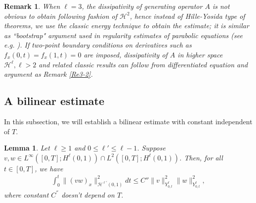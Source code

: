 \documentclass[10pt,a4paper,final]{article}
\numberwithin{equation}{section}
\newtheorem{lemma}[theorem]{Lemma}
\newtheorem{remark}[theorem]{Remark}
\newcommand{\cH}{\mathcal{H}}
\begin{document}
\begin{remark}
When $\ell=3$, the dissipativity of generating operator $A$ is not obvious to obtain following fashion of $\cH^2$, hence instead of Hille-Yosida type of theorems, we use the classic energy technique to obtain the estimate; it is similar as ``bootstrap" argument used in regularity estimates of parabolic equations (see e.g. \cite{Qin}). If two-point boundary conditions on derivatives such as $f_x(0, t)=f_x(1, t)=0$ are imposed, dissipativity of $A$ in higher space $\cH^{\ell}, \ell>2$ and related classic results can follow from differentiated equation and  argument as Remark \ref{Re3-2}.
\end{remark}

\subsection{A bilinear estimate}
In this subsection, we will establish a bilinear estimate with constant independent of $T$.
\begin{lemma}\label{bilinearest}
    Let $\ell\geq 1$ and $0\leq \ell'\leq \ell-1$. Suppose $v,w\in L^{\infty}([0,T]; H^\ell(0,1))\cap L^2([0,T]; H^\ell(0,1))$. Then, for all $t\in [0,T]$, we have 
     \begin{align*}
        \int_0^t\|(vw)_x\|_{\cH^{\ell'}(0,1)}^2dt\leq C'' \|v\|_{Y^{\ell}_{0,t}}^2\|w\|_{Y^{\ell}_{0,t}}^2,
    \end{align*}
    where constant $C^{''}$ doesn't depend on $T$.
\end{lemma}
\end{document}
